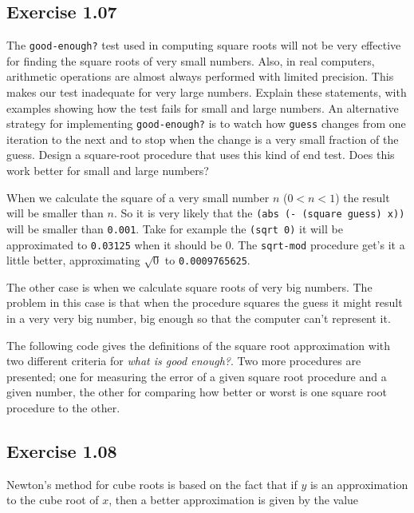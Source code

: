 \documentclass[letterpaper, leqno]{article}
\begin{document}
\subsection*{Exercise 1.07}
The \texttt{good-enough?} test used in computing square roots will not be very effective for finding the square roots of very small numbers. Also, in real computers, arithmetic operations are almost always performed with limited precision. This makes our test inadequate for very large numbers. Explain these statements, with examples showing how the test fails for small and large numbers. An alternative strategy for implementing \texttt{good-enough?} is to watch how \texttt{guess} changes from one iteration to the next and to stop when the change is a very small fraction of the guess. Design a square-root procedure that uses this kind of end test. Does this work better for small and large numbers?

\bigskip

\textcolor{answer}{
  When we calculate the square of a very small number $n$ ($0 < n < 1$) the result will be smaller than $n$. So it is very likely that the \texttt{(abs (- (square guess) x))} will be smaller than \texttt{0.001}. Take for example the \texttt{(sqrt 0)} it will be approximated to \texttt{0.03125} when it should be 0. The \texttt{sqrt-mod} procedure get's it a little better, approximating $\sqrt{0}$ to \texttt{0.0009765625}.
}

\textcolor{answer}{
  The other case is when we calculate square roots of very big numbers. The problem in this case is that when the procedure squares the guess it might result in a very very big number, big enough so that the computer can't represent it.
}

\bigskip

\textcolor{answer}{
  The following code gives the definitions of the square root approximation with two different criteria for \emph{what is good enough?}. Two more procedures are presented; one for measuring the error of a given square root procedure and a given number, the other for comparing how better or worst is one square root procedure to the other.
}

\bigskip



\subsection*{Exercise 1.08}
Newton's method for cube roots is based on the fact that if $y$ is an approximation to the cube root of $x$, then a better approximation is given by the value
\end{document}
